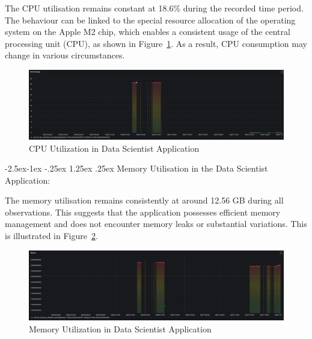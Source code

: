 \documentclass[review]{elsarticle}
\makeatletter
\renewcommand\paragraph{\@startsection{paragraph}{4}{\z@}%
            {-2.5ex\@plus -1ex \@minus -.25ex}%
            {1.25ex \@plus .25ex}%
            {\normalfont\normalsize\itshape}}
\makeatother
\begin{document}
The CPU utilisation remains constant at 18.6\% during the recorded time period. The behaviour can be linked to the special resource allocation of the operating system on the Apple M2 chip, which enables a consistent usage of the central processing unit (CPU), as shown in Figure~\ref{cpuUtilizationInDataScientistApplication}. As a result, CPU consumption may change in various circumstances.

\begin{figure}[ht]

  \centering

  \includegraphics[width=\textwidth]{images/CPU-utilization-data-scientist-application.png}

  \caption{CPU Utilization in Data Scientist Application}

  \label{cpuUtilizationInDataScientistApplication}

\end{figure}

\paragraph{Memory Utilisation in the Data Scientist Application:}

The memory utilisation remains consistently at around 12.56 GB during all observations. This suggests that the application possesses efficient memory management and does not encounter memory leaks or substantial variations. This is illustrated in Figure~\ref{memoryUtilizationInDataScientistApplication}.

\begin{figure}[ht]

  \centering

  \includegraphics[width=\textwidth]{images/memory-utilization-in-data-scientist-application.png}

  \caption{Memory Utilization in Data Scientist Application}

  \label{memoryUtilizationInDataScientistApplication}

\end{figure}
\end{document}
